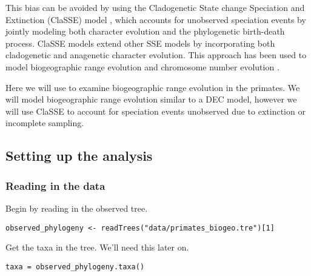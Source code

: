 This bias can be avoided by using the 
Cladogenetic State change Speciation and Extinction
(ClaSSE) model \citep{Goldberg2012},
which accounts for unobserved speciation events
by jointly modeling both character evolution
and the phylogenetic birth-death process.
ClaSSE models extend other SSE models by incorporating both cladogenetic 
and anagenetic character evolution.
This approach has been used to model biogeographic range evolution \citep{Goldberg2011}
and chromosome number evolution \citep{Freyman2017}.

Here we will use \RevBayes to examine biogeographic range evolution in the primates.
We will model biogeographic range evolution similar to a DEC model, 
however we will use ClaSSE to account for speciation events unobserved due 
to extinction or incomplete sampling.

\subsection{Setting up the analysis}

\subsubsection{Reading in the data}

Begin by reading in the observed tree.
{\tt \begin{snugshade*}
\begin{lstlisting}
observed_phylogeny <- readTrees("data/primates_biogeo.tre")[1]
\end{lstlisting}
\end{snugshade*}}

Get the taxa in the tree. We'll need this later on.
{\tt \begin{snugshade*}
\begin{lstlisting}
taxa = observed_phylogeny.taxa()
\end{lstlisting}
\end{snugshade*}}

